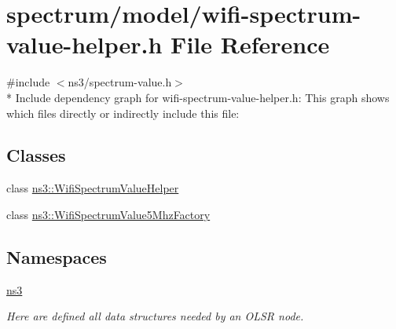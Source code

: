 \hypertarget{wifi-spectrum-value-helper_8h}{}\section{spectrum/model/wifi-\/spectrum-\/value-\/helper.h File Reference}
\label{wifi-spectrum-value-helper_8h}
{\ttfamily \#include $<$ns3/spectrum-\/value.\+h$>$}\\*
Include dependency graph for wifi-\/spectrum-\/value-\/helper.h\+:
This graph shows which files directly or indirectly include this file\+:
\subsection*{Classes}
\begin{DoxyCompactItemize}
\item 
class \hyperlink{classns3_1_1WifiSpectrumValueHelper}{ns3\+::\+Wifi\+Spectrum\+Value\+Helper}
\item 
class \hyperlink{classns3_1_1WifiSpectrumValue5MhzFactory}{ns3\+::\+Wifi\+Spectrum\+Value5\+Mhz\+Factory}
\end{DoxyCompactItemize}
\subsection*{Namespaces}
\begin{DoxyCompactItemize}
\item 
 \hyperlink{namespacens3}{ns3}
\begin{DoxyCompactList}\small\item\em Here are defined all data structures needed by an O\+L\+SR node. \end{DoxyCompactList}\end{DoxyCompactItemize}
